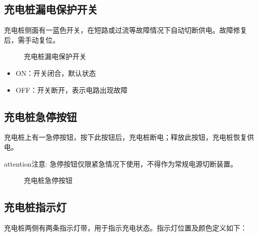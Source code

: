 \documentclass[a4paper,11pt,english,openany,oneside]{sphinxmanual}
\begin{document}
\subsection{充电桩漏电保护开关}
\label{\detokenize{_u9009_u914d_u8bbe_u5907:id10}}\label{\detokenize{_u9009_u914d_u8bbe_u5907:id11}}
\sphinxAtStartPar
充电桩侧面有一蓝色开关，在短路或过流等故障情况下自动切断供电。故障修复后，需手动复位。

\begin{figure}[H]
\centering
\capstart

\noindent{}
\caption{充电桩漏电保护开关}\label{\detokenize{_u9009_u914d_u8bbe_u5907:id33}}\end{figure}
\begin{itemize}
\item {} 
\sphinxAtStartPar
ON：开关闭合，默认状态

\item {} 
\sphinxAtStartPar
OFF：开关断开，表示电路出现故障

\end{itemize}


\subsection{充电桩急停按钮}
\label{\detokenize{_u9009_u914d_u8bbe_u5907:id12}}\label{\detokenize{_u9009_u914d_u8bbe_u5907:id13}}
\sphinxAtStartPar
充电桩上有一急停按钮，按下此按钮后，充电桩断电；释放此按钮，充电桩恢复供电。

\begin{sphinxadmonition}{attention}{注意:}
\sphinxAtStartPar
急停按钮仅限紧急情况下使用，不得作为常规电源切断装置。
\end{sphinxadmonition}

\begin{figure}[H]
\centering
\capstart

\noindent{}
\caption{充电桩急停按钮}\label{\detokenize{_u9009_u914d_u8bbe_u5907:id34}}\end{figure}


\subsection{充电桩指示灯}
\label{\detokenize{_u9009_u914d_u8bbe_u5907:id14}}\label{\detokenize{_u9009_u914d_u8bbe_u5907:id15}}
\sphinxAtStartPar
充电桩两侧有两条指示灯带，用于指示充电状态。指示灯位置及颜色定义如下：
\end{document}
